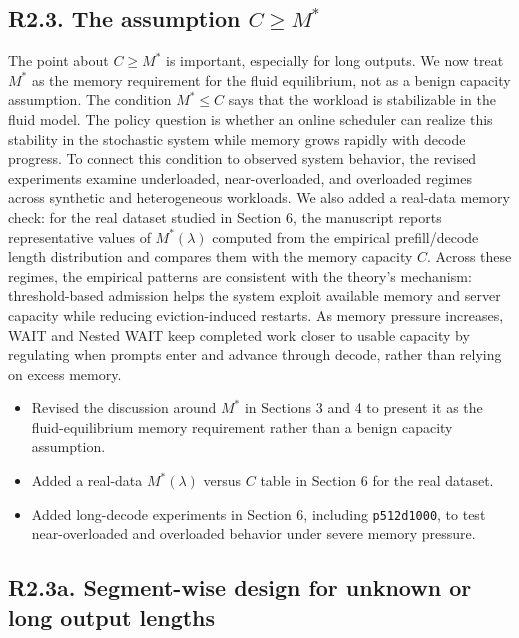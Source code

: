 \subsection*{R2.3. The assumption \(C \ge M^*\)}


\response The point about \(C \ge M^*\) is important, especially for long outputs. We now treat \(M^*\) as the memory requirement for the fluid equilibrium, not as a benign capacity assumption. The condition \(M^*\le C\) says that the workload is stabilizable in the fluid model. The policy question is whether an online scheduler can realize this stability in the stochastic system while memory grows rapidly with decode progress. To connect this condition to observed system behavior, the revised experiments examine underloaded, near-overloaded, and overloaded regimes across synthetic and heterogeneous workloads. We also added a real-data memory check: for the real dataset studied in Section 6, the manuscript reports representative values of \(M^*(\lambda)\) computed from the empirical prefill/decode length distribution and compares them with the memory capacity \(C\). Across these regimes, the empirical patterns are consistent with the theory's mechanism: threshold-based admission helps the system exploit available memory and server capacity while reducing eviction-induced restarts. As memory pressure increases, WAIT and Nested WAIT keep completed work closer to usable capacity by regulating when prompts enter and advance through decode, rather than relying on excess memory.

\changes
\begin{itemize}
    \item Revised the discussion around \(M^*\) in Sections 3 and 4 to present it as the fluid-equilibrium memory requirement rather than a benign capacity assumption.
    \item Added a real-data \(M^*(\lambda)\) versus \(C\) table in Section 6 for the real dataset.
    \item Added long-decode experiments in Section 6, including \texttt{p512d1000}, to test near-overloaded and overloaded behavior under severe memory pressure.
\end{itemize}

\subsection*{R2.3a. Segment-wise design for unknown or long output lengths}

